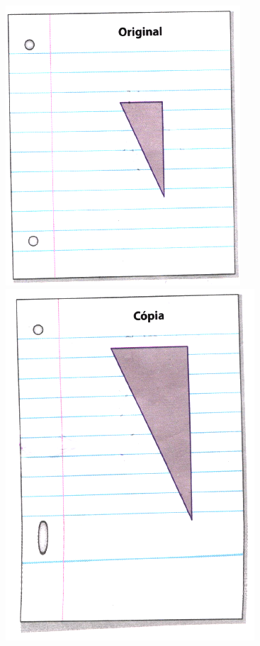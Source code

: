 \documentclass[a4paper,14pt]{article}
\begin{document}
\begin{multicols}{2}
\begin{enumerate}
			\includegraphics[width=1\linewidth]{6FMA143_imagens/imagem1}
			\\
			\includegraphics[width=1\linewidth]{6FMA143_imagens/imagem2}

\end{enumerate}
\end{multicols}
\end{document}
